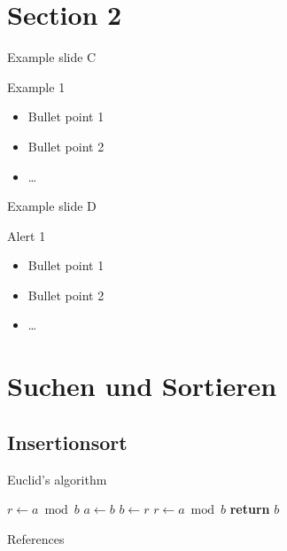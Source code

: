 \documentclass[18pt]{beamer}
\begin{document}
\section{Section 2}
\begin{frame}{Example slide C}
	\begin{exampleblock}{Example 1}
	\begin{itemize}
	\item Bullet point 1
	\pause
	\item Bullet point 2
	\item \dots
	\end{itemize}
	\end{exampleblock}
\end{frame}

\begin{frame}{Example slide D}
	\begin{alertblock}{Alert 1}
	\begin{itemize}
	\item Bullet point 1
	\pause
	\item Bullet point 2
	\item \dots
	\end{itemize}
	\end{alertblock}
\end{frame}



\section{Suchen und Sortieren}
\subsection{Insertionsort}
\begin{frame}
\begin{algorithm}[H]
	\caption{Euclid’s algorithm}\label{euclid}
	\begin{algorithmic}[1]
		\State $r\gets a\bmod b$
		\State $a\gets b$
		\State $b\gets r$
		\State $r\gets a\bmod b$
		\EndWhile\label{euclidendwhile}
		\State \textbf{return} $b$
		\EndProcedure
	\end{algorithmic}
\end{algorithm}
\end{frame}


\appendix
\beginbackup

\begin{frame}[allowframebreaks]{References}
	\printbibliography
\end{frame}

\backupend
\end{document}
